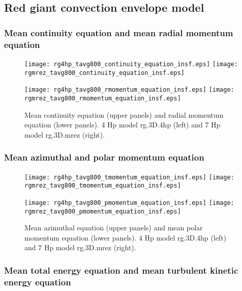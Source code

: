 \documentclass[10pt,paper=a4]{report}
\begin{document}
\newpage

\subsection{Red giant convection envelope model}

\subsubsection{Mean continuity equation and mean radial momentum equation}

\begin{figure}[!h]
\centerline{
\texttt{[image: rg4hp\_tavg800\_continuity\_equation\_insf.eps]}
\texttt{[image: rgmrez\_tavg800\_continuity\_equation\_insf.eps]}}

\centerline{
\texttt{[image: rg4hp\_tavg800\_rmomentum\_equation\_insf.eps]}
\texttt{[image: rgmrez\_tavg800\_rmomentum\_equation\_insf.eps]}}
\caption{Mean continuity equation (upper panels) and radial momentum equation (lower panels). 4 Hp model {\sf rg.3D.4hp} (left) and 7 Hp model {\sf rg.3D.mrez} (right).}
\end{figure}
 
\newpage

\subsubsection{Mean azimuthal and polar momentum equation}

\begin{figure}[!h]
\centerline{
\texttt{[image: rg4hp\_tavg800\_tmomentum\_equation\_insf.eps]}
\texttt{[image: rgmrez\_tavg800\_tmomentum\_equation\_insf.eps]}}

\centerline{
\texttt{[image: rg4hp\_tavg800\_pmomentum\_equation\_insf.eps]}
\texttt{[image: rgmrez\_tavg800\_pmomentum\_equation\_insf.eps]}}
\caption{Mean azimuthal equation (upper panels) and mean polar momentum equation (lower panels). 4 Hp model {\sf rg.3D.4hp} (left) and 7 Hp model {\sf rg.3D.mrez} (right).}
\end{figure}

\newpage

\subsubsection{Mean total energy equation and mean turbulent kinetic energy equation}
\end{document}
